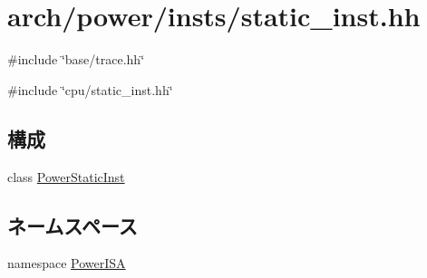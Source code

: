 \hypertarget{arch_2power_2insts_2static__inst_8hh}{
\section{arch/power/insts/static\_\-inst.hh}
\label{arch_2power_2insts_2static__inst_8hh}
}
{\ttfamily \#include \char`\"{}base/trace.hh\char`\"{}}\par
{\ttfamily \#include \char`\"{}cpu/static\_\-inst.hh\char`\"{}}\par
\subsection*{構成}
\begin{DoxyCompactItemize}
\item 
class \hyperlink{classPowerISA_1_1PowerStaticInst}{PowerStaticInst}
\end{DoxyCompactItemize}
\subsection*{ネームスペース}
\begin{DoxyCompactItemize}
\item 
namespace \hyperlink{namespacePowerISA}{PowerISA}
\end{DoxyCompactItemize}
